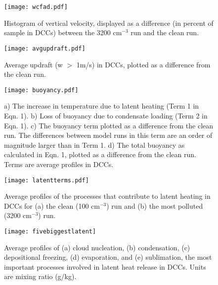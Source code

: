 \begin{figure}[t]
  \noindent\texttt{[image: wcfad.pdf]}\\
  \caption{Histogram of vertical velocity, displayed as a difference (in percent of sample in DCCs) between the 3200 cm$^{-3}$ run and the clean run.}\label{wcfad}
\end{figure}


\begin{figure}[t]
  \noindent\texttt{[image: avgupdraft.pdf]}\\
  \caption{Average updraft (w $>$ 1m/s) in DCCs, plotted as a difference from the clean run.}\label{avgupdraft}
\end{figure}

\begin{figure}[t]
  \noindent\texttt{[image: buoyancy.pdf]}\\
  \caption{a) The increase in temperature due to latent heating (Term 1 in Eqn. 1).  b) Loss of buoyancy due to condensate loading (Term 2 in Eqn. 1).  c) The buoyancy term plotted as a difference from the clean run. The differences between model runs in this term are an order of magnitude larger than in Term 1.  d) The total buoyancy as calculated in Eqn. 1, plotted as a difference from the clean run.  Terms are average profiles in DCCs.}\label{buoyancy}
\end{figure}

\begin{figure}[t]
  \noindent\texttt{[image: latentterms.pdf]}\\
  \caption{Average profiles of the processes that contribute to latent heating in DCCs for (a) the clean (100 cm$^{-3}$) run and (b) the most polluted (3200 cm$^{-3}$) run.}\label{latentterms}
\end{figure}

\begin{figure}[t]
  \noindent\texttt{[image: fivebiggestlatent]}\\
  \caption{Average profiles of (a) cloud nucleation, (b) condensation, (c) depositional freezing, (d) evaporation, and (e) sublimation, the most important processes involved in latent heat release in DCCs.  Units are mixing ratio (g/kg).}\label{fivebiggestlatent}
\end{figure}



